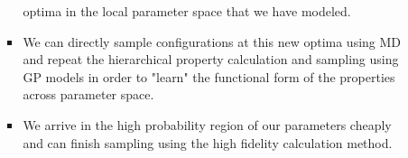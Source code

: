\documentclass[aps,pre,nofootinbib,superscriptaddress,linenumbers,10pt, draft,tightenlines]{revtex4-1}
\begin{document}
\begin{itemize}
\begin{itemize}
\begin{itemize}
                  optima in the local parameter space that we have modeled.
            \item We can directly sample configurations at this new optima using MD and 
                  repeat the hierarchical property calculation and sampling using GP
                  models in order to "learn" the functional form of the properties
                  across parameter space.
            \item We arrive in the high probability region of our parameters cheaply and can 
                  finish sampling using the high fidelity calculation method. 
        \end{itemize}
    \end{itemize}
\end{itemize}
\end{document}
